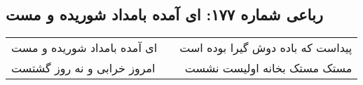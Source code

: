 \begin{center}
\section*{رباعی شماره ۱۷۷: ای آمده بامداد شوریده و مست}
\label{sec:0177}
\begin{longtable}{l p{0.5cm} r}
ای آمده بامداد شوریده و مست
&&
پیداست که باده دوش گیرا بوده است
\\
امروز خرابی و نه روز گشتست
&&
مستک مستک بخانه اولیست نشست
\\
\end{longtable}
\end{center}

